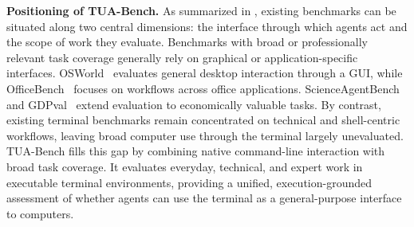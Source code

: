 \documentclass{llmxive}
\providecommand{\benchname}{\mbox{TUA-Bench}\xspace}
\begin{document}
\noindent\textbf{Positioning of \benchname.}
As summarized in , existing benchmarks can be situated along two central dimensions: the interface through which agents act and the scope of work they evaluate. Benchmarks with broad or professionally relevant task coverage generally rely on graphical or application-specific interfaces. OSWorld~\citep{xie2024osworld} evaluates general desktop interaction through a GUI, while OfficeBench~\citep{wang2024officebench} focuses on workflows across office applications. ScienceAgentBench~\citep{chen2025scienceagentbench} and GDPval~\citep{patwardhan2025gdpval} extend evaluation to economically valuable tasks. By contrast, existing terminal benchmarks remain concentrated on technical and shell-centric workflows, leaving broad computer use through the terminal largely unevaluated. \benchname fills this gap by combining native command-line interaction with broad task coverage. It evaluates everyday, technical, and expert work in executable terminal environments, providing a unified, execution-grounded assessment of whether agents can use the terminal as a general-purpose interface to computers.
\end{document}
